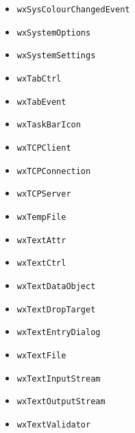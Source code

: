 \documentclass[a4paper,11pt,oneside,titlepage]{report}
\begin{document}
\begin{itemize}
\item \texttt{wxSysColourChangedEvent}
\item \texttt{wxSystemOptions}
\item \texttt{wxSystemSettings}
\item \texttt{wxTabCtrl}
\item \texttt{wxTabEvent}
\item \texttt{wxTaskBarIcon}
\item \texttt{wxTCPClient}
\item \texttt{wxTCPConnection}
\item \texttt{wxTCPServer}
\item \texttt{wxTempFile}
\item \texttt{wxTextAttr}
\item \texttt{wxTextCtrl}
\item \texttt{wxTextDataObject}
\item \texttt{wxTextDropTarget}
\item \texttt{wxTextEntryDialog}
\item \texttt{wxTextFile}
\item \texttt{wxTextInputStream}
\item \texttt{wxTextOutputStream}
\item \texttt{wxTextValidator}


\end{itemize}
\end{document}
